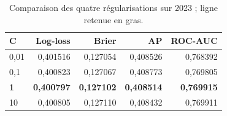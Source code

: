 \begin{table}[htbp]
\centering\small
\renewcommand{\arraystretch}{1.18}
\caption{Comparaison des quatre régularisations sur 2023 ; ligne retenue en gras.}\label{tab:ml-selection}
\begin{tabular*}{\textwidth}{@{\extracolsep{\fill}}lrrrr@{}}
\toprule
C & Log-loss & Brier & AP & ROC-AUC \\
\midrule
0,01 & 0,401516 & 0,127054 & 0,408526 & 0,768392 \\
0,1 & 0,400823 & 0,127067 & 0,408773 & 0,769805 \\
\textbf{1} & \textbf{0,400797} & \textbf{0,127102} & \textbf{0,408514} & \textbf{0,769915} \\
10 & 0,400805 & 0,127110 & 0,408432 & 0,769911 \\
\bottomrule
\end{tabular*}
\end{table}
